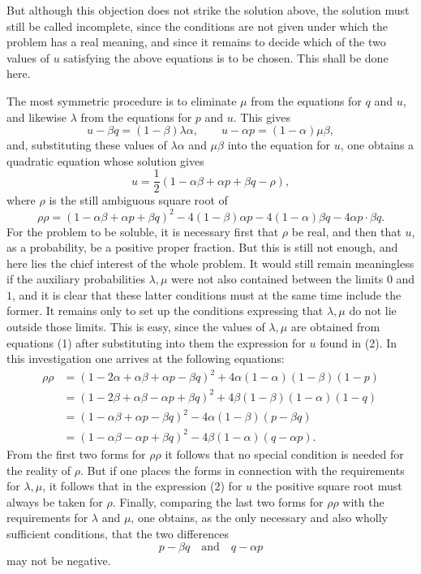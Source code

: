 \documentclass[11pt]{article}
\begin{document}
But although this objection does not strike the solution above, the solution must still be called incomplete, since the conditions are not given under which the problem has a real meaning, and since it remains to decide which of the two values of $u$ satisfying the above equations is to be chosen. This shall be done here.

The most symmetric procedure is to eliminate $\mu$ from the equations for $q$ and $u$, and likewise $\lambda$ from the equations for $p$ and $u$. This gives
\begin{equation}
u-\beta q=(1-\beta)\lambda\alpha,
\qquad
u-\alpha p=(1-\alpha)\mu\beta,
\tag{1}
\end{equation}
and, substituting these values of $\lambda\alpha$ and $\mu\beta$ into the equation for $u$, one obtains a quadratic equation whose solution gives
\begin{equation}
u=\frac12(1-\alpha\beta+\alpha p+\beta q-\rho),
\tag{2}
\end{equation}
where $\rho$ is the still ambiguous square root of
\[
\rho\rho=(1-\alpha\beta+\alpha p+\beta q)^2-4(1-\beta)\alpha p
-4(1-\alpha)\beta q-4\alpha p\cdot\beta q.
\]
For the problem to be soluble, it is necessary first that $\rho$ be real, and then that $u$, as a probability, be a positive proper fraction. But this is still not enough, and here lies the chief interest of the whole problem. It would still remain meaningless if the auxiliary probabilities $\lambda,\mu$ were not also contained between the limits $0$ and $1$, and it is clear that these latter conditions must at the same time include the former. It remains only to set up the conditions expressing that $\lambda,\mu$ do not lie outside those limits. This is easy, since the values of $\lambda,\mu$ are obtained from equations (1) after substituting into them the expression for $u$ found in (2). In this investigation one arrives at the following equations:
\[
\begin{aligned}
\rho\rho&=(1-2\alpha+\alpha\beta+\alpha p-\beta q)^2
+4\alpha(1-\alpha)(1-\beta)(1-p)\\
&=(1-2\beta+\alpha\beta-\alpha p+\beta q)^2
+4\beta(1-\beta)(1-\alpha)(1-q)\\
&=(1-\alpha\beta+\alpha p-\beta q)^2-4\alpha(1-\beta)(p-\beta q)\\
&=(1-\alpha\beta-\alpha p+\beta q)^2-4\beta(1-\alpha)(q-\alpha p).
\end{aligned}
\]
From the first two forms for $\rho\rho$ it follows that no special condition is needed for the reality of $\rho$. But if one places the forms in connection with the requirements for $\lambda,\mu$, it follows that in the expression (2) for $u$ the positive square root must always be taken for $\rho$. Finally, comparing the last two forms for $\rho\rho$ with the requirements for $\lambda$ and $\mu$, one obtains, as the only necessary and also wholly sufficient conditions, that the two differences
\begin{equation}
p-\beta q\quad\text{and}\quad q-\alpha p
\tag{3}
\end{equation}
may not be negative.
\end{document}
